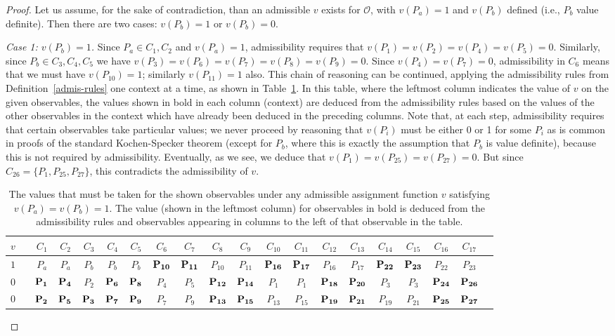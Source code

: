 \documentclass[%
 superscriptaddress,
 preprint,
 showpacs,
 showkeys,
 nofootinbib,
  amsmath,amssymb,
  aps,
  longbibliography,
  floatfix,
 ]{revtex4-1}
\theoremstyle{definition}
\begin{document}
\begin{proof}
	Let us assume, for the sake of contradiction, than an admissible $v$ exists for $\mathcal{O}$, with $v(P_a)=1$ and $v(P_b)$ defined (i.e., $P_b$ value definite).
	Then there are two cases: $v(P_b)=1$ or $v(P_b)=0$.
	
	\emph{Case 1: $v(P_b)=1$.}
	Since $P_a\in C_1,C_2$ and $v(P_a)=1$, admissibility requires that $v(P_1)=v(P_2)=v(P_4)=v(P_5)=0$.
	Similarly, since $P_b\in C_3,C_4,C_5$ we have $v(P_3)=v(P_6)=v(P_7)=v(P_8)=v(P_9)=0$.
	Since $v(P_4)=v(P_7)=0$, admissibility in $C_6$ means that we must have $v(P_{10})=1$; similarly $v(P_{11})=1$ also.
	This chain of reasoning can be continued, applying the admissibility rules from Definition~\ref{admis-rules} one context at a time, as shown in Table~\ref{table:proofTable1}.
	In this table, where the leftmost column indicates the value of $v$ on the given observables, the values shown in bold in each column (context) are deduced from the admissibility rules based on the values of the other observables in the context which have already been deduced in the preceding columns.
	Note that, at each step, admissibility requires that certain observables take particular values;
	we never proceed by reasoning that $v(P_i)$ must be either 0 or 1 for some $P_i$ as is common in proofs of the standard Kochen-Specker theorem (except for $P_b$, where this is exactly the assumption that $P_b$ is value definite), because this is not required by admissibility.
	Eventually, as we see, we deduce that $v(P_1)=v(P_{25})=v(P_{27})=0$.
	But since $C_{26}=\{P_1,P_{25},P_{27}\}$, this contradicts the admissibility of $v$.
	
	\begin{table}[ht]
		\setlength{\tabcolsep}{6pt}
		\caption{The values that must be taken for the shown observables under any admissible assignment function $v$ satisfying $v(P_a) = v(P_b)=1$. The value (shown in the leftmost column) for observables in bold is deduced from the admissibility rules and observables appearing in columns to the left of that observable in the table.}
		\begin{tabular}{cccccccccccccccccccc}
		\hline
		$v$ && $C_1$ & $C_2$ & $C_3$ & $C_4$ & $C_5$ & $C_6$ & $C_7$ & $C_8$ & $C_9$ & $C_{10}$ & $C_{11}$ & $C_{12}$ & $C_{13}$ & $C_{14}$ & $C_{15}$ & $C_{16}$ & $C_{17}$\\
		\hline
		\hline
		$1$ && $P_a$ & $P_a$ & $P_b$ & $P_b$ & $P_b$ & $\bf P_{10}$ & $\bf P_{11}$ & $P_{10}$ & $P_{11}$ & $\bf P_{16}$ & $\bf P_{17}$ & $P_{16}$ & $P_{17}$ & $\bf P_{22}$ & $\bf P_{23}$ & $P_{22}$ & $P_{23}$\\
		$0$ && $\bf P_1$ & $\bf P_4$ & $P_2$ & $\bf P_6$ & $\bf P_8$ & $P_4$ & $P_5$ & $\bf P_{12}$ & $\bf P_{14}$ & $P_1$ & $P_1$ & $\bf P_{18}$ & $\bf P_{20}$ & $P_3$ & $P_3$ & $\bf P_{24}$ & $\bf P_{26}$\\
		$0$ && $\bf P_2$ & $\bf P_5$ & $\bf P_3$ & $\bf P_7$ & $\bf P_9$ & $P_7$ & $P_9$ & $\bf P_{13}$ & $\bf P_{15}$ & $P_{13}$ & $P_{15}$ & $\bf P_{19}$ & $\bf P_{21}$ & $P_{19}$ & $P_{21}$ & $\bf P_{25}$ & $\bf P_{27}$\\
		\hline
		\end{tabular}
		\label{table:proofTable1}
	\end{table}
	

\end{proof}
\end{document}
